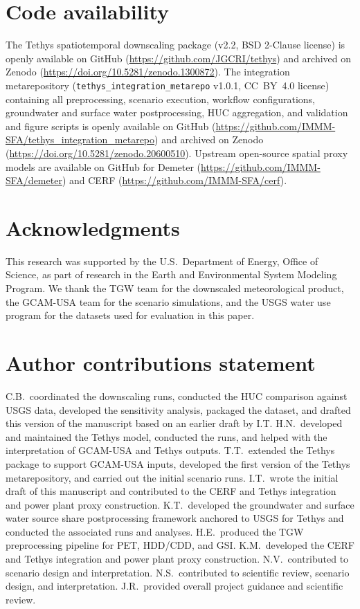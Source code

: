 \documentclass[fleqn,10pt]{wlscirep}
\begin{document}
\section*{Code availability}

The Tethys spatiotemporal downscaling package\cite{niazi_2026_20552731} (v2.2, BSD 2-Clause license) is openly available on GitHub (\url{https://github.com/JGCRI/tethys}) and archived on Zenodo (\url{https://doi.org/10.5281/zenodo.1300872}). The integration metarepository\cite{cambrackenIMMMSFATethys_integration_metarepoV1012026} (\texttt{tethys\_integration\_metarepo} v1.0.1, CC~BY~4.0 license) containing all preprocessing, scenario execution, workflow configurations, groundwater and surface water postprocessing, HUC aggregation, and validation and figure scripts is openly available on GitHub (\url{https://github.com/IMMM-SFA/tethys_integration_metarepo}) and archived on Zenodo (\url{https://doi.org/10.5281/zenodo.20600510}). Upstream open-source spatial proxy models are available on GitHub for Demeter\cite{Vernon-2018} (\url{https://github.com/IMMM-SFA/demeter}) and CERF\cite{Vernon2021} (\url{https://github.com/IMMM-SFA/cerf}).

\section*{Acknowledgments}

This research was supported by the U.S.~Department of Energy, Office of Science, as part of research in the Earth and Environmental System Modeling Program. We thank the TGW team for the downscaled meteorological product, the GCAM-USA team for the scenario simulations, and the USGS water use program for the datasets used for evaluation in this paper.

\section*{Author contributions statement}

C.B.~coordinated the downscaling runs, conducted the HUC comparison against USGS data, developed the sensitivity analysis, packaged the dataset, and drafted this version of the manuscript based on an earlier draft by I.T. 
H.N.~developed and maintained the Tethys model, conducted the runs, and helped with the interpretation of GCAM-USA and Tethys outputs. 
T.T.~extended the Tethys package to support GCAM-USA inputs, developed the first version of the Tethys metarepository, and carried out the initial scenario runs. 
I.T.~wrote the initial draft of this manuscript and contributed to the CERF and Tethys integration and power plant proxy construction. 
K.T.~developed the groundwater and surface water source share postprocessing framework anchored to USGS for Tethys and conducted the associated runs and analyses. 
H.E.~produced the TGW preprocessing pipeline for PET, HDD/CDD, and GSI. 
K.M.~developed the CERF and Tethys integration and power plant proxy construction. 
N.V.~contributed to scenario design and interpretation. 
N.S.~contributed to scientific review, scenario design, and interpretation. 
J.R.~provided overall project guidance and scientific review. 
\end{document}
